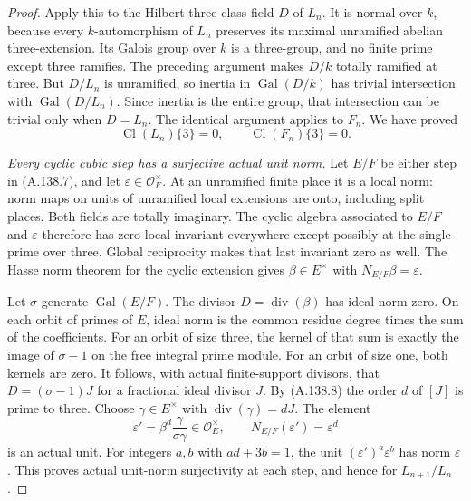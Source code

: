 \begin{proof}
Apply this to the Hilbert three-class field
\(D\) of \(L_n\).
It is normal over \(k\), because every
\(k\)-automorphism of \(L_n\) preserves its
maximal unramified abelian three-extension.
Its Galois group over \(k\) is a three-group,
and no finite prime except three ramifies.
The preceding argument makes \(D/k\) totally
ramified at three.
But \(D/L_n\) is unramified, so inertia in
\(\operatorname{Gal}(D/k)\) has trivial
intersection with \(\operatorname{Gal}(D/L_n)\).
Since inertia is the entire group,
that intersection can be trivial only when
\(D=L_n\).
The identical argument applies to \(F_n\).
We have proved
\[
             \operatorname{Cl}(L_n)\{3\}=0,
             \qquad \operatorname{Cl}(F_n)\{3\}=0 .
\tag{A.138.8}
\]

\emph{Every cyclic cubic step has a surjective actual unit norm.}
Let \(E/F\) be either step in (A.138.7), and
let \(\varepsilon\in\mathcal O_F^\times\).
At an unramified finite place it is a local
norm: norm maps on units of unramified local
extensions are onto, including split places.
Both fields are totally imaginary.
The cyclic algebra associated to \(E/F\) and
\(\varepsilon\) therefore has zero local invariant
everywhere except possibly at the single prime
over three.
Global reciprocity makes that last invariant
zero as well.
The Hasse norm theorem for the cyclic extension
\cite[V, Theorem 5.3 and VIII, Theorem 3.1]{MilneCFT}
gives \(\beta\in E^\times\) with
\(N_{E/F}\beta=\varepsilon\).

Let \(\sigma\) generate \(\operatorname{Gal}(E/F)\).
The divisor \(D=\operatorname{div}(\beta)\)
has ideal norm zero.
On each orbit of primes of \(E\), ideal norm
is the common residue degree times the sum
of the coefficients.
For an orbit of size three, the kernel of that
sum is exactly the image of \(\sigma-1\) on
the free integral prime module.
For an orbit of size one, both kernels are zero.
It follows, with actual finite-support divisors,
that \(D=(\sigma-1)J\) for a fractional ideal
divisor \(J\).
By (A.138.8) the order \(d\) of \([J]\) is
prime to three.
Choose \(\gamma\in E^\times\) with
\(\operatorname{div}(\gamma)=dJ\).
The element
\[
 \varepsilon'=\beta^d\frac{\gamma}{\sigma\gamma}
       \in\mathcal O_E^\times,\qquad
 N_{E/F}(\varepsilon')=\varepsilon^d
\tag{A.138.9}
\]
is an actual unit.
For integers \(a,b\) with \(ad+3b=1\), the
unit \((\varepsilon')^a\varepsilon^b\) has
norm \(\varepsilon\).
This proves actual unit-norm surjectivity
at each step, and hence for \(L_{n+1}/L_n\).


\end{proof}
